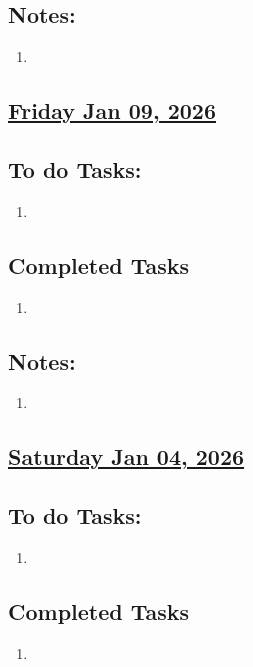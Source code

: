 \subsection*{Notes:}
\begin{enumerate}
    \item 
\end{enumerate}
\subsection*{\underline{Friday Jan 09, 2026}}
\subsection*{To do Tasks:}
\begin{enumerate}
    \item  
\end{enumerate}
\subsection*{Completed Tasks}
\begin{enumerate}[\ding{52}]  %
    \item 
\end{enumerate}
\subsection*{Notes:}
\begin{enumerate}
    \item 
\end{enumerate}
\subsection*{\underline{Saturday Jan 04, 2026} }
\subsection*{To do Tasks:}
\begin{enumerate}
    \item 
\end{enumerate}
\subsection*{Completed Tasks}
\begin{enumerate}[\ding{52}]  %
    \item 
\end{enumerate}
